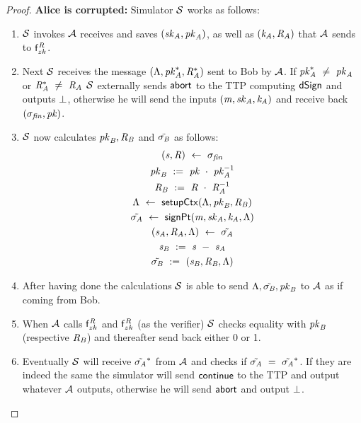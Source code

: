 \begin{proof}
    \textbf{Alice is corrupted: } Simulator $\mathcal{S}$ works as follows:
    \begin{enumerate}
        \item $\mathcal{S}$ invokes $\mathcal{A}$ receives and saves $(\mathit{sk}_{\mathit{A}}, \mathit{pk}_{\mathit{A}})$, as well as $(\mathit{\mathit{k}_{\mathit{A}}}, \mathit{R}_{\mathit{A}})$ that $\mathcal{A}$ sends to $\mathsf{f}^{\mathit{R}}_{zk}$.
        \item Next $\mathcal{S}$ receives the message $(\Lambda, \mathit{pk}_{\mathit{A}}^*, \mathit{R}_{\mathit{A}}^*)$ sent to Bob by $\mathcal{A}$.
        If $\mathit{pk}_{\mathit{A}}^* ~\neq~ \mathit{pk}_{\mathit{A}}$ or $\mathit{R}_{\mathit{A}}^* ~\neq~ \mathit{R}_{\mathit{A}}$ $\mathcal{S}$ externally sends $\mathsf{abort}$ to the TTP computing $\mathsf{dSign}$ and outputs $\bot$, otherwise he will send the inputs $(\mathit{m}, \mathit{sk}_{\mathit{A}}, \mathit{\mathit{k}_{\mathit{A}}})$ and receive back $(\sigma_{\mathit{fin}}, \mathit{pk})$.
        \item $\mathcal{S}$ now calculates $\mathit{pk}_{\mathit{B}}, \mathit{R}_{\mathit{B}}$ and $\tilde{\sigma_{\mathit{B}}}$ as follows:
        \begin{gather*}
            (\mathit{s}, \mathit{R}) ~\leftarrow~ \sigma_{\mathit{fin}} \\
            \mathit{pk}_{\mathit{B}} ~:=~ \mathit{pk} ~\cdot~ \mathit{pk}_{\mathit{A}}^{-1} \\
            \mathit{R}_{\mathit{B}} ~:=~ \mathit{R} ~\cdot~ \mathit{R}_{\mathit{A}}^{-1} \\
            \Lambda ~\leftarrow~ \mathsf{setupCtx}( \Lambda, \mathit{pk}_{\mathit{B}}, \mathit{R}_{\mathit{B}} ) \\
            \tilde{\sigma_{\mathit{A}}} ~\leftarrow~ \mathsf{signPt}(\mathit{m}, \mathit{sk}_{\mathit{A}}, \mathit{\mathit{k}_{\mathit{A}}}, \Lambda) \\
            (\mathit{s}_{\mathit{A}}, \mathit{R}_{\mathit{A}}, \Lambda) ~\leftarrow~ \tilde{\sigma_{\mathit{A}}} \\
            \mathit{s}_{\mathit{B}} ~:=~ \mathit{s} ~-~ \mathit{s}_{\mathit{A}} \\
            \tilde{\sigma_{\mathit{B}}} ~:=~ (\mathit{s}_{\mathit{B}}, \mathit{R}_{\mathit{B}}, \Lambda)
        \end{gather*}
        \item After having done the calculations $\mathcal{S}$ is able to send $\Lambda, \tilde{\sigma_{\mathit{B}}}, \mathit{pk}_{\mathit{B}}$ to $\mathcal{A}$ as if coming from Bob.
        \item When $\mathcal{A}$ calls $\mathsf{f}^{\mathit{R}}_{zk}$ and $\mathsf{f}^{\mathit{R}}_{zk}$ (as the verifier) $\mathcal{S}$ checks equality with $\mathit{pk}_{\mathit{B}}$ (respective $\mathit{R}_{\mathit{B}}$) and thereafter send back either 0 or 1.
        \item Eventually $\mathcal{S}$ will receive $\tilde{\sigma_{\mathit{A}}}^*$ from $\mathcal{A}$ and checks if $\tilde{\sigma_{\mathit{A}}} ~=~ \tilde{\sigma_{\mathit{A}}}^*$.
        If they are indeed the same the simulator will send $\mathsf{continue}$ to the TTP and output whatever $\mathcal{A}$ outputs, otherwise he will send $\mathsf{abort}$ and output $\bot$.
    \end{enumerate}


\end{proof}

